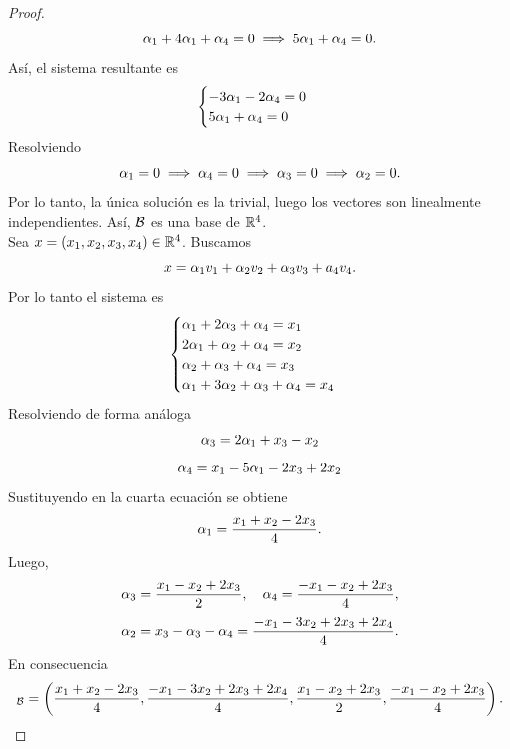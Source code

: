 \documentclass[12pt,a4paper]{article}
\newcommand{\paren}[1]{\left( #1 \right)}
\begin{document}
\begin{proof}
\begin{equation*}
            \alpha_{1}+4\alpha_{1}+\alpha_{4}=0\implies 5\alpha_{1}+\alpha_{4}=0.
        \end{equation*}
        Así, el sistema resultante es
        \begin{equation*}
            \begin{cases}
                -3\alpha_{1}-2\alpha_{4}=0\\
                5\alpha_{1}+\alpha_{4}=0
            \end{cases}
        \end{equation*}
        Resolviendo
        \begin{equation*}
            \alpha_{1}=0\implies \alpha_{4}=0\implies \alpha_{3}=0\implies \alpha_{2}=0.
        \end{equation*}
        Por lo tanto, la única solución es la trivial, luego los vectores son linealmente
        independientes. Así, $\mathcal{B}$ es una base de $\mathbb{R}^{4}$.\\
        Sea $x=(x_{1},x_{2},x_{3},x_{4})\in\mathbb{R}^{4}$. Buscamos
        \begin{equation*}
            x=\alpha_{1}v_{1}+\alpha_{2}v_{2}+\alpha_{3}v_{3}+a_{4}v_{4}.
        \end{equation*}
        Por lo tanto el sistema es
        \begin{equation*}
            \begin{cases}
                \alpha_{1}+2\alpha_{3}+\alpha_{4}=x_{1}\\
                2\alpha_{1}+\alpha_{2}+\alpha_{4}=x_{2}\\
                \alpha_{2}+\alpha_{3}+\alpha_{4}=x_{3}\\
                \alpha_{1}+3\alpha_{2}+\alpha_{3}+\alpha_{4}=x_{4}
            \end{cases}
        \end{equation*}
        Resolviendo de forma análoga
        \begin{equation*}
            \alpha_{3}=2\alpha_{1}+x_{3}-x_{2}
        \end{equation*}
        \begin{equation*}
            \alpha_{4}=x_{1}-5\alpha_{1}-2x_{3}+2x_{2}
        \end{equation*}
        Sustituyendo en la cuarta ecuación se obtiene
        \begin{equation*}
            \alpha_{1}=\frac{x_{1}+x_{2}-2x_{3}}{4}.
        \end{equation*}
        Luego,
        \begin{equation*}
            \alpha_{3}=\frac{x_{1}-x_{2}+2x_{3}}{2},\quad\alpha_{4}=\frac{-x_{1}-x_{2}+2x_{3}}{4},
        \end{equation*}
        \begin{equation*}
            \alpha_{2}=x_{3}-\alpha_{3}-\alpha_{4}=\frac{-x_{1}-3x_{2}+2x_{3}+2x_{4}}{4}.
        \end{equation*}
        En consecuencia
        \begin{equation*}
            [x]_{\BB}=\paren{\frac{x_{1}+x_{2}-2x_{3}}{4},\frac{-x_{1}-3x_{2}+2x_{3}+2x_{4}}{4},\frac{x_{1}-x_{2}+2x_{3}}{2},\frac{-x_{1}-x_{2}+2x_{3}}{4}}.
        \end{equation*}
    \end{proof}
\end{document}

